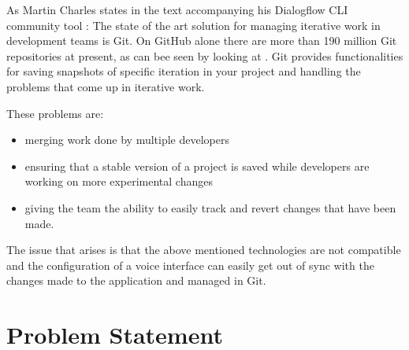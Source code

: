 As Martin Charles states in the text accompanying his Dialogflow CLI community tool \cite[page 1]{0xcaff2018}:
The state of the art solution for managing iterative work in development teams is Git. On GitHub alone there are more than 190 million Git repositories at present, as can bee seen by looking at \cite{Githuba}.
Git provides functionalities for saving snapshots of specific iteration in your project and handling the problems that come up in iterative work.\\
\begin{samepage}
    These problems are:
    \begin{itemize}
        \item merging work done by multiple developers
        \item ensuring that a stable version of a project is saved while developers are working on more experimental changes
        \item giving the team the ability to easily track and revert changes that have been made.
    \end{itemize}
\end{samepage}

The issue that arises is that the above mentioned technologies are not compatible and the configuration of a voice interface can easily get out of sync with the changes made to the application and managed in Git.

\chapter{Problem Statement}

